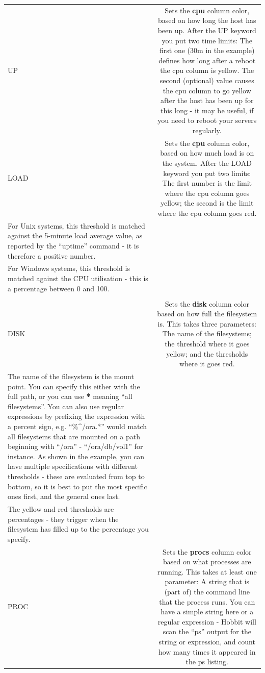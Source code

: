 \begin{tabular}{lc}
UP &Sets the \textbf{cpu}
 column color, based on how long the host has been up. After the UP keyword you put two time limits: The first one (30m in the example) defines how long after a reboot the cpu column is yellow. The second (optional) value causes the cpu column to go yellow after the host has been up for this long - it may be useful, if you need to reboot your servers regularly.  \\
LOAD &Sets the \textbf{cpu}
 column color, based on how much load is on the system. After the LOAD keyword you put two limits: The first number is the limit where the cpu column goes yellow; the second is the limit where the cpu column goes red.\\ 
 For Unix systems, this threshold is matched against the 5-minute load average value, as reported by the ``uptime'' command - it is therefore a positive number.\\ 
 For Windows systems, this threshold is matched against the CPU utilisation - this is a percentage between 0 and 100.\\ 
 \\
DISK &Sets the \textbf{disk}
 column color based on how full the filesystem is. This takes three parameters: The name of the filesystems; the threshold where it goes yellow; and the thresholds where it goes red.\\ 
 The name of the filesystem is the mount point. You can specify this either with the full path, or you can use \textbf{*}
 meaning ``all filesystems''. You can also use regular expressions by prefixing the expression with a percent sign, e.g. ``\%\^{}/ora.*'' would match all filesystems that are mounted on a path beginning with ``/ora'' - ``/ora/db/vol1'' for instance. As shown in the example, you can have multiple specifications with different thresholds - these are evaluated from top to bottom, so it is best to put the most specific ones first, and the general ones last.\\ 
 The yellow and red thresholds are percentages - they trigger when the filesystem has filled up to the percentage you specify.  \\
PROC &Sets the \textbf{procs}
 column color based on what processes are running. This takes at least one parameter: A string that is (part of) the command line that the process runs. You can have a simple string here or a regular expression - Hobbit will scan the ``ps'' output for the string or expression, and count how many times it appeared in the ps listing.\\ 

\end{tabular}
